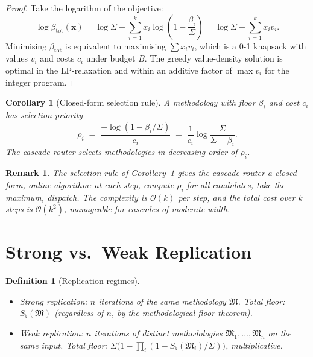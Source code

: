\documentclass[11pt,a4paper]{article}
\newtheorem{corollary}[theorem]{Corollary}
\newtheorem{definition}[theorem]{Definition}
\newtheorem{remark}[theorem]{Remark}
\newcommand{\Method}{\mathfrak{M}}
\newcommand{\Sigmax}{\Sigma}
\newcommand{\Sfloor}{S_{\flat}}
\begin{document}
\begin{proof}
Take the logarithm of the objective:
\[
\log \beta_{\text{tot}}(\mathbf{x}) = \log \Sigmax + \sum_{i=1}^{k} x_i \log\left(1 - \frac{\beta_i}{\Sigmax}\right) = \log \Sigmax - \sum_{i=1}^{k} x_i v_i.
\]
Minimising $\beta_{\text{tot}}$ is equivalent to maximising $\sum x_i v_i$, which is a 0-1 knapsack with values $v_i$ and costs $c_i$ under budget $B$. The greedy value-density solution is optimal in the LP-relaxation \citep{cormen2009introduction} and within an additive factor of $\max v_i$ for the integer program.
\end{proof}

\begin{corollary}[Closed-form selection rule]
\label{cor:closed-form-selection}
A methodology with floor $\beta_i$ and cost $c_i$ has selection priority
\[
\rho_i \;=\; \frac{-\log(1 - \beta_i/\Sigmax)}{c_i} \;=\; \frac{1}{c_i} \log\frac{\Sigmax}{\Sigmax - \beta_i}.
\]
The cascade router selects methodologies in decreasing order of $\rho_i$.
\end{corollary}

\begin{remark}
\label{rem:selection-rule-implementation}
The selection rule of Corollary~\ref{cor:closed-form-selection} gives the cascade router a closed-form, online algorithm: at each step, compute $\rho_i$ for all candidates, take the maximum, dispatch. The complexity is $\mathcal{O}(k)$ per step, and the total cost over $k$ steps is $\mathcal{O}(k^2)$, manageable for cascades of moderate width.
\end{remark}

\section{Strong vs.\ Weak Replication}
\label{sec:replication}

\begin{definition}[Replication regimes]
\label{def:replication}
\begin{itemize}[nosep, leftmargin=*]
\item \emph{Strong replication}: $n$ iterations of the same methodology $\Method$. Total floor: $\Sfloor(\Method)$ (regardless of $n$, by the methodological floor theorem).
\item \emph{Weak replication}: $n$ iterations of distinct methodologies $\Method_1, \ldots, \Method_n$ on the same input. Total floor: $\Sigmax \bigl(1 - \prod_i (1 - \Sfloor(\Method_i)/\Sigmax)\bigr)$, multiplicative.
\end{itemize}
\end{definition}
\end{document}
